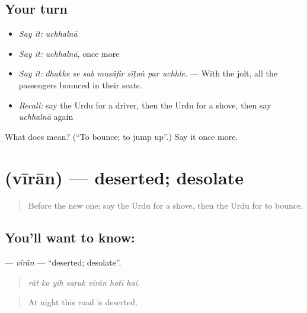 \subsection*{Your turn}
\begin{itemize}
\raggedright
  \item \emph{Say it:} \emph{uchhalnā}
  \item \emph{Say it:} \emph{uchhalnā}, once more
  \item \emph{Say it:} \emph{dhakke se sab musāfir sīṭoṅ par uchhle.} — With the jolt, all the passengers bounced in their seats.
  \item \emph{Recall:} say the Urdu for a driver, then the Urdu for a shove, then say \emph{uchhalnā} again
\end{itemize}

\begin{tcolorbox}[breakable,colback=teal!4,colframe=teal!35!black,title={Before you move on}]
What does  mean? (\textquotedblleft{}To bounce; to jump up\textquotedblright{}.) Say it once more.
\end{tcolorbox}
\section[\texorpdfstring{\ur{ویران} (vīrān)}{ویران (vīrān)}]{ (vīrān) — deserted; desolate}

\label{lesson:UR-C394-viran}



\begin{quote}
Before the new one: say the Urdu for a shove, then the Urdu for to bounce.
\end{quote}

\subsection*{You'll want to know: }
\textbf{} — \emph{vīrān} — \textquotedblleft{}deserted; desolate\textquotedblright{}.

\begin{quote}
      
\end{quote}

\begin{quote}
\emph{rāt ko yih saṛak vīrān hotī hai.}
\end{quote}

\begin{quote}
At night this road is deserted.
\end{quote}

